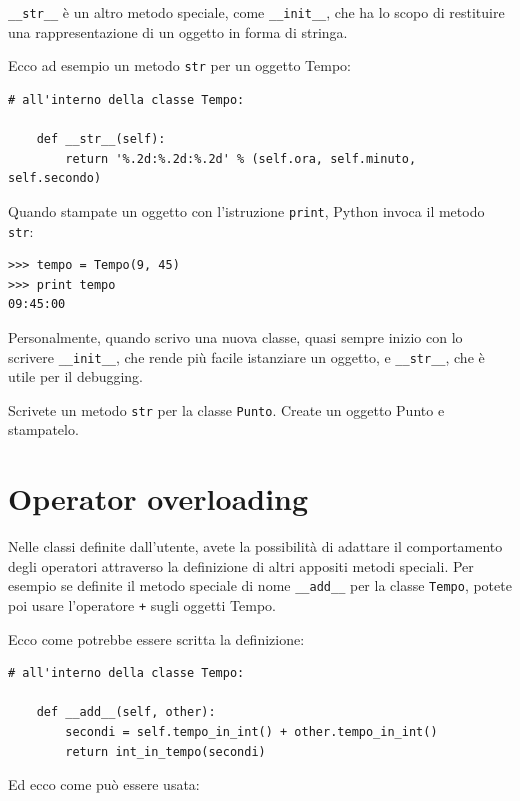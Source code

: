 \documentclass[10pt]{book}
\begin{document}
\verb"__str__" è un altro metodo speciale, come \verb"__init__",
che ha lo scopo di restituire una rappresentazione di un oggetto in forma di stringa.

Ecco ad esempio un metodo {\tt str} per un oggetto Tempo:

\begin{verbatim}
# all'interno della classe Tempo:

    def __str__(self):
        return '%.2d:%.2d:%.2d' % (self.ora, self.minuto, self.secondo)
\end{verbatim}
%
Quando stampate un oggetto con l'istruzione {\tt print}, Python invoca il metodo {\tt str}:

\begin{verbatim}
>>> tempo = Tempo(9, 45)
>>> print tempo
09:45:00
\end{verbatim}
%
Personalmente, quando scrivo una nuova classe, quasi sempre inizio con lo scrivere \verb"__init__", che rende più facile istanziare un oggetto, e 
\verb"__str__", che è utile per il debugging.

\vspace{0.2in}
\begin{exercise}

Scrivete un metodo {\tt str} per la classe {\tt Punto}.  Create un oggetto Punto e stampatelo.

\end{exercise}


\section{Operator overloading}
\label{operator.overloading}

Nelle classi definite dall'utente, avete la possibilità di adattare il comportamento degli operatori attraverso la definizione di altri appositi metodi speciali. Per esempio se definite il metodo speciale di nome \verb"__add__" per la classe {\tt Tempo}, potete poi usare l'operatore {\tt +} sugli oggetti Tempo.

Ecco come potrebbe essere scritta la definizione:

\begin{verbatim}
# all'interno della classe Tempo:

    def __add__(self, other):
        secondi = self.tempo_in_int() + other.tempo_in_int()
        return int_in_tempo(secondi)
\end{verbatim}
%
Ed ecco come può essere usata:
\end{document}
